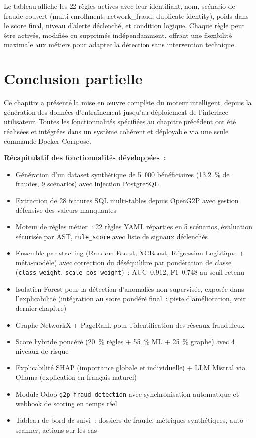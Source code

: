 \documentclass[a4paper, oneside, 12pt]{book}
\begin{document}
\hspace{0.5cm}Le tableau affiche les 22 règles actives avec leur identifiant, nom, scénario de fraude couvert (multi-enrollment, network\_fraud, duplicate identity), poids dans le score final, niveau d'alerte déclenché, et condition logique. Chaque règle peut être activée, modifiée ou supprimée indépendamment, offrant une flexibilité maximale aux métiers pour adapter la détection sans intervention technique.

\section{Conclusion partielle}

\hspace{0.5cm}Ce chapitre a présenté la mise en œuvre complète du moteur intelligent, depuis la génération des données d'entraînement jusqu'au déploiement de l'interface utilisateur. Toutes les fonctionnalités spécifiées au chapitre précédent ont été réalisées et intégrées dans un système cohérent et déployable via une seule commande Docker Compose.

\textbf{Récapitulatif des fonctionnalités développées~:}

\begin{itemize}
    \item Génération d'un dataset synthétique de 5~000 bénéficiaires (13,2~\% de fraudes, 9 scénarios) avec injection PostgreSQL
    \item Extraction de 28 features SQL multi-tables depuis OpenG2P avec gestion défensive des valeurs manquantes
    \item Moteur de règles métier~: 22 règles YAML réparties en 5 scénarios, évaluation sécurisée par AST, \texttt{rule\_score} avec liste de signaux déclenchés
    \item Ensemble par stacking (Random Forest, XGBoost, Régression Logistique + méta-modèle) avec correction du déséquilibre par pondération de classe (\texttt{class\_weight}, \texttt{scale\_pos\_weight})~: AUC~0,912, F1~0,748 au seuil retenu
    \item Isolation Forest pour la détection d'anomalies non supervisée, exposée dans l'explicabilité (intégration au score pondéré final~: piste d'amélioration, voir dernier chapitre)
    \item Graphe NetworkX + PageRank pour l'identification des réseaux frauduleux
    \item Score hybride pondéré (20~\% règles + 55~\% ML + 25~\% graphe) avec 4 niveaux de risque
    \item Explicabilité SHAP (importance globale et individuelle) + LLM Mistral via Ollama (explication en français naturel)
    \item Module Odoo \texttt{g2p\_fraud\_detection} avec synchronisation automatique et webhook de scoring en temps réel
    \item Tableau de bord de suivi~: dossiers de fraude, métriques synthétiques, auto-scanner, actions sur les cas
\end{itemize}
\end{document}
